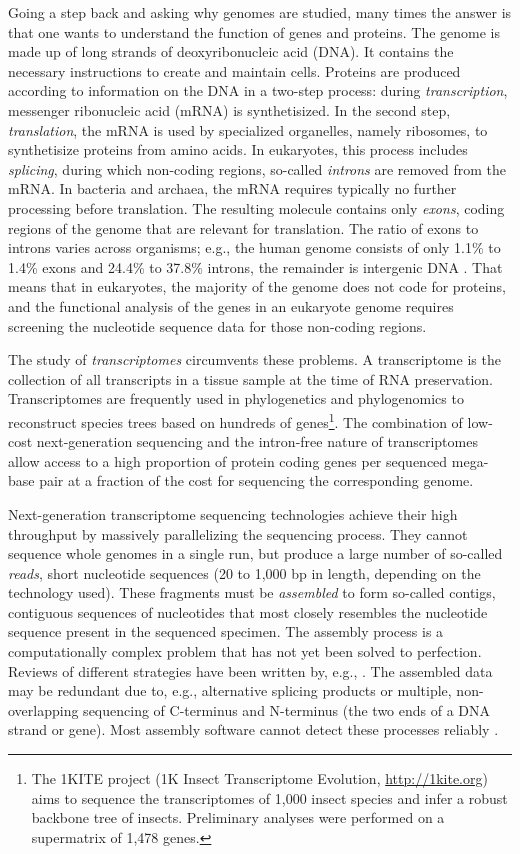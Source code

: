 Going a step back and asking why genomes are studied, many times the answer is
that one wants to understand the function of genes and proteins. The genome is
made up of long strands of deoxyribonucleic acid (DNA). It contains the
necessary instructions to create and maintain cells.  Proteins are produced
according to information on the DNA in a two-step process: during
\emph{transcription}, messenger ribonucleic acid (mRNA) is synthetisized. In the
second step, \emph{translation}, the mRNA is used by specialized organelles,
namely ribosomes, to synthetisize proteins from amino acids. In eukaryotes, this
process includes \emph{splicing}, during which non-coding regions, so-called
\emph{introns} are removed from the mRNA. In bacteria and archaea, the mRNA
requires typically no further processing before translation. The resulting
molecule contains only \emph{exons}, coding regions of the genome that are
relevant for translation. The ratio of exons to introns varies across organisms;
e.g., the human genome consists of only 1.1\% to 1.4\% exons and 24.4\% to
37.8\% introns, the remainder is intergenic DNA \citep{venter2001}. That means
that in eukaryotes, the majority of the genome does not code for proteins, and
the functional analysis of the genes in an eukaryote genome requires screening
the nucleotide sequence data for those non-coding regions.

The study of \emph{transcriptomes} circumvents these problems. A transcriptome
is the collection of all transcripts in a tissue sample at the time of RNA preservation.
Transcriptomes are frequently used in phylogenetics and phylogenomics to reconstruct
species trees based on hundreds of genes\footnote{The 1KITE project (1K Insect
Transcriptome Evolution, \url{http://1kite.org}) aims to sequence the
transcriptomes of 1,000 insect species and infer a robust backbone tree of
insects. Preliminary analyses were performed on a supermatrix of 1,478 genes.}.
The combination of low-cost next-generation sequencing and the intron-free
nature of transcriptomes allow access to a high proportion of protein coding
genes per sequenced mega-base pair at a fraction of the cost for sequencing the
corresponding genome.

Next-generation transcriptome sequencing technologies achieve their high
throughput by massively parallelizing the sequencing process. They cannot
sequence whole genomes in a single run, but produce a large number of so-called
\emph{reads}, short nucleotide sequences (20 to 1,000 bp in length, depending on
the technology used). These fragments must be \emph{assembled} to form so-called
contigs, contiguous sequences of nucleotides that most closely resembles the
nucleotide sequence present in the sequenced specimen. The assembly process is a
computationally complex problem that has not yet been solved to perfection.
Reviews of different strategies have been written by, e.g., \citet{zhang2011}.
The assembled data may be redundant due to, e.g., alternative splicing products
\citep{black2003} or multiple, non-overlapping sequencing of C-terminus and
N-terminus (the two ends of a DNA strand or gene). Most assembly software cannot
detect these processes reliably \citep{haiminen2011}. 

